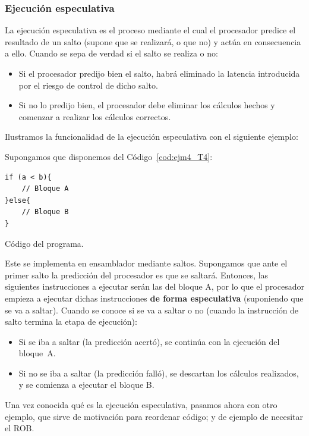\subsubsection{Ejecución especulativa}
La ejecución especulativa es el proceso mediante el cual el procesador predice el resultado de un salto (supone que se realizará, o que no) y actúa en consecuencia a ello. Cuando se sepa de verdad si el salto se realiza o no:
\begin{itemize}
    \item Si el procesador predijo bien el salto, habrá eliminado la latencia introducida por el riesgo de control de dicho salto.
    \item Si no lo predijo bien, el procesador debe eliminar los cálculos hechos y comenzar a realizar los cálculos correctos.
\end{itemize}
Ilustramos la funcionalidad de la ejecución especulativa con el siguiente ejemplo:
\begin{ejemplo}
    Supongamos que disponemos del Código~\ref{cod:ejm4_T4}:
    \begin{listing}[H]
    \begin{verbatim}
if (a < b){
    // Bloque A
}else{
    // Bloque B
}
    \end{verbatim}
    \caption{Código del programa.}
    \label{cod:ejm4_T4}
    \end{listing}
    Este se implementa en ensamblador mediante saltos. Supongamos que ante el primer salto la predicción del procesador es que se saltará. Entonces, las siguientes instrucciones a ejecutar serán las del bloque A, por lo que el procesador empieza a ejecutar dichas instrucciones \textbf{de forma especulativa} (suponiendo que se va a saltar). Cuando se conoce si se va a saltar o no (cuando la instrucción de salto termina la etapa de ejecución):
    \begin{itemize}
        \item Si se iba a saltar (la predicción acertó), se continúa con la ejecución del bloque~A.
        \item Si no se iba a saltar (la predicción falló), se descartan los cálculos realizados, y se comienza a ejecutar el bloque B.
    \end{itemize}
\end{ejemplo}

Una vez conocida qué es la ejecución especulativa, pasamos ahora con otro ejemplo, que sirve de motivación para reordenar código; y de ejemplo de necesitar el ROB.

